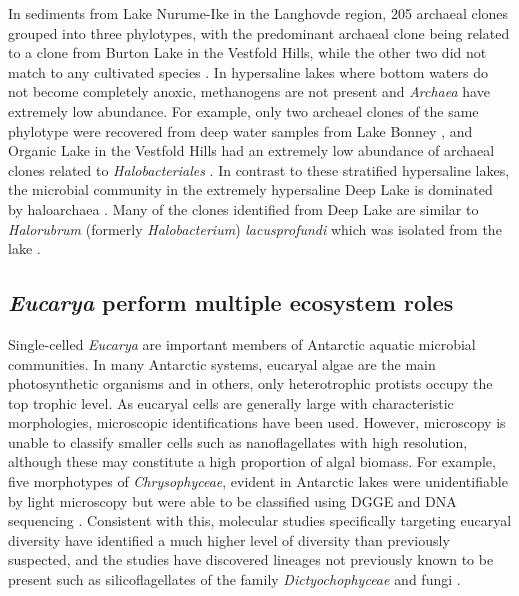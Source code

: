 In sediments from Lake Nurume-Ike in the Langhovde region, 205 archaeal clones grouped into three phylotypes, 
with the predominant archaeal clone being related to a clone from Burton Lake in the Vestfold Hills, while the other two did not match to any cultivated species \cite{Kurosawa2010}. 
In hypersaline lakes where bottom waters do not become completely anoxic, methanogens are not present and \emph{Archaea} have extremely low abundance. 
For example, only two archeael clones of the same phylotype were recovered from deep water samples from Lake Bonney \cite{Glatz2006}, 
and Organic Lake in the Vestfold Hills had an extremely low abundance of archaeal clones related to \emph{Halobacteriales} \cite{Bowman2000a}. 
In contrast to these stratified hypersaline lakes, the microbial community in the extremely hypersaline Deep Lake is dominated by haloarchaea \cite{Bowman2000a}. 
Many of the clones identified from Deep Lake are similar to \emph{Halorubrum} (formerly \emph{Halobacterium}) \emph{lacusprofundi} which was isolated from the lake \cite{Franzmann1988}. 


\subsection{\emph{Eucarya} perform multiple ecosystem roles}

Single-celled \emph{Eucarya} are important members of Antarctic aquatic microbial communities.
In many Antarctic systems, eucaryal algae are the main photosynthetic organisms and in others, only heterotrophic protists occupy the top trophic level. 
As eucaryal cells are generally large with characteristic morphologies, microscopic identifications have been used. 
However, microscopy is unable to classify smaller cells such as nanoflagellates with high resolution, although these may constitute a high proportion of algal biomass.
For example, five morphotypes of \emph{Chrysophyceae}, evident in Antarctic lakes were unidentifiable by light microscopy but were able to be classified using \ac{DGGE} and \textsc{DNA} sequencing \cite{Unrein2005}.
Consistent with this, molecular studies specifically targeting eucaryal diversity \cite{Unrein2005, Mosier2007, Bielewicz2011} have identified a much higher level of diversity than previously suspected,
 and the studies have discovered lineages not previously known to be present such as silicoflagellates of the family \emph{Dictyochophyceae} \cite{Unrein2005} and fungi \cite{Mosier2007, Bielewicz2011}.

